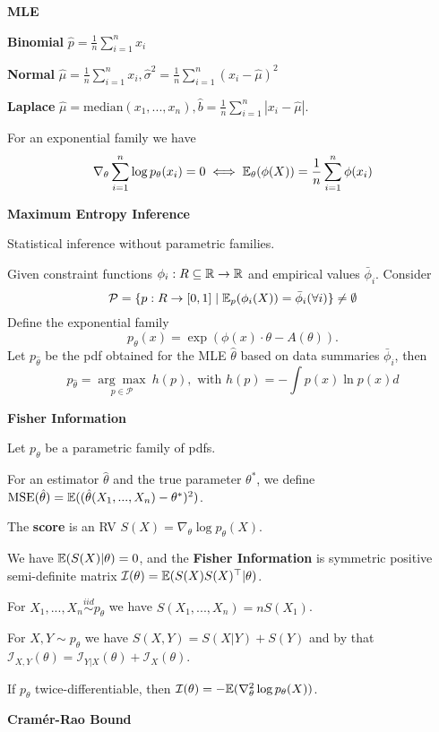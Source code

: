 \textbf{MLE}

\textbf{Binomial} \(\hat{p} = \frac{1}{n}\sum_{i = 1}^n x_i\)

\textbf{Normal} \(\hat{\mu} = \frac{1}{n}\sum_{i= 1}^n x_i, \hat{\sigma}^2 = \frac{1}{n}\sum_{i = 1}^n (x_i - \hat{\mu})^2\)


\textbf{Laplace} \(\hat{\mu} = \text{median}(x_1, ...,x_n), \hat{b} = \frac{1}{n}\sum_{i=1}^n|x_i-\hat{\mu}|\).


For an exponential family we have
\[\nabla_\theta \sum_{i = 1}^n \log p_\theta(x_i) = 0 \iff \mathbb{E}_\theta(\phi(X)) = \frac{1}{n}\sum_{i = 1}^n\phi(x_i)\]

\textbf{Maximum Entropy Inference}

Statistical inference without parametric families.

Given constraint functions \(\phi_i: R \subseteq \mathbb{R} \to \mathbb{R}\) and empirical values \(\bar{\phi}_i\). Consider
\[\mathcal{P} = \{p: R \to [0, 1] \mid \mathbb{E}_p(\phi_i(X)) = \bar{\phi}_i (\forall i) \}\neq \emptyset\]
Define the exponential family
\[p_{\theta}(x) = \exp(\phi(x)\cdot \theta - A(\theta)).\]
Let \(p_{\hat{\theta}}\) be the pdf obtained for the MLE \(\hat{\theta}\) based on data summaries 
\(\bar{\phi}_i\), then
\[p_{\hat{\theta}} = \underset{p \in \mathcal{P}}{\arg \max} \ h(p), \text{ with } h(p) = - \int p(x) \ln p(x) d\]

\textbf{Fisher Information}

Let \(p_\theta\) be a parametric family of pdfs. 

For an estimator \(\hat{\theta}\) and the true parameter \(\theta^*\), we define 
\(\text{MSE}(\hat{\theta}) = \mathbb{E}((\hat{\theta}(X_1, ..., X_n) - \theta^*)^2)\).

The \textbf{score} is an RV \(S(X) = \nabla_\theta \log p_\theta(X)\).

We have \(\mathbb{E}(S(X)|\theta) = 0\), and the \textbf{Fisher Information} is 
symmetric positive semi-definite matrix \(\mathcal{I}(\theta) = \mathbb{E}(S(X)S(X)^\top | \theta)\).

For \(X_1, ..., X_n \overset{iid}{\sim} p_{\theta}\) we have \(S(X_1, ...,X_n) = n S(X_1)\).

For \(X, Y \sim p_{\theta}\) we have \(S(X, Y) = S(X|Y)+S(Y)\) and by that 
\(\mathcal{I}_{X, Y}(\theta) = \mathcal{I}_{Y|X}(\theta) + \mathcal{I}_{X}(\theta)\).

If \(p_\theta\) twice-differentiable, then \(\mathcal{I}(\theta) = -\mathbb{E}(\nabla_\theta^2 \log p_\theta(X))\).

\textbf{Cramér-Rao Bound}

